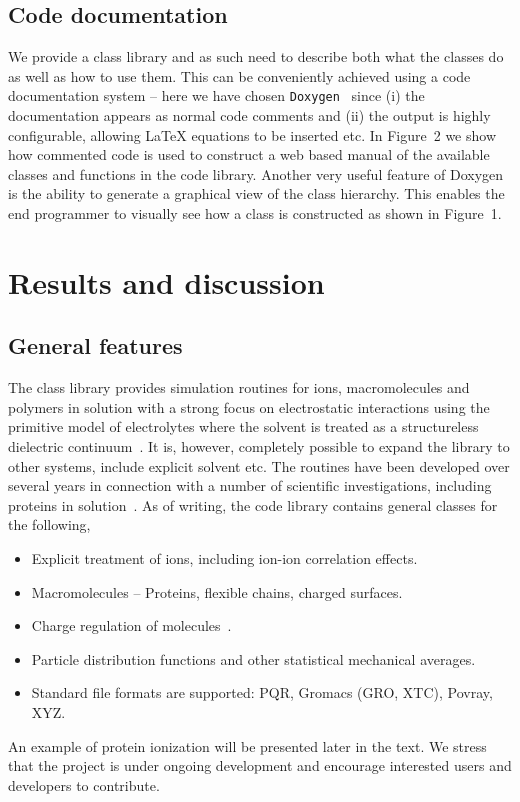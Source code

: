 \documentclass[10pt]{bmc_article}
\newenvironment{bmcformat}{\begin{raggedright}\baselineskip20pt\sloppy\setboolean{publ}{false}}{\end{raggedright}\baselineskip20pt\sloppy}
\begin{document}
\begin{bmcformat}
\subsection*{Code documentation}
We provide a class library and as such need to describe both what the classes do as well as how to use them.
This can be conveniently achieved using a code documentation system -- here we have chosen \verb"Doxygen"~\cite{doxygen} since
(i) the documentation appears as normal code comments and
(ii) the output is highly configurable, allowing LaTeX equations to be inserted etc.
In Figure~2 we show how commented code is used to construct a web based manual of the available
classes and functions in the code library.
Another very useful feature of Doxygen is the ability to generate a graphical view of the class hierarchy.
This enables the end programmer to visually see how a class is constructed as shown in Figure~1.

 
\section*{Results and discussion}
\subsection*{General features}
The class library provides simulation routines for ions, macromolecules and polymers in solution with a strong focus on electrostatic interactions using the primitive model of electrolytes where the solvent is treated as a structureless dielectric continuum~\cite{hill:86}.
It is, however, completely possible to expand the library to other systems, include explicit solvent etc. The routines have been developed over several years in connection with a number of scientific investigations, including proteins in solution~\cite{lund-thesis}.
As of writing, the code library contains general classes for the following,
\begin{itemize}
\item Explicit treatment of ions, including ion-ion correlation effects.
\item Macromolecules -- Proteins, flexible chains, charged surfaces.
\item Charge regulation of molecules~\cite{lund:05}.
\item Particle distribution functions and other statistical mechanical averages.
\item Standard file formats are supported: PQR, Gromacs (GRO, XTC), Povray, XYZ.
\end{itemize}
An example of protein ionization will be presented later in the text.
We stress that the project is under ongoing development and encourage interested users and developers to contribute.


\end{bmcformat}
\end{document}
